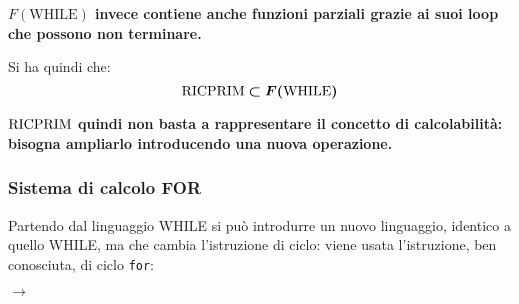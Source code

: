 \textbf{$F(\text{WHILE})$ invece contiene anche funzioni parziali grazie ai suoi loop che possono
non terminare.}

Si ha quindi che:
$$ \bm{\text{RICPRIM} \subset F(\text{WHILE})} $$

\textbf{$\text{RICPRIM}$ quindi non basta a rappresentare il concetto di calcolabilità: bisogna 
ampliarlo introducendo una nuova operazione.}

\subsubsection*{Sistema di calcolo FOR}
Partendo dal linguaggio WHILE si può introdurre un nuovo linguaggio, identico a quello WHILE,
ma che cambia l'istruzione di ciclo: viene usata l'istruzione, ben conosciuta, di
ciclo \texttt{for}:

\begin{center}
\begin{minipage}{.43\textwidth}
\begin{tcolorbox}[colback=white,sharp corners,boxrule=.2mm]
\end{tcolorbox}
\end{minipage}
\begin{minipage}{.1\textwidth}
    \hspace{1.5em}$\to$
\end{minipage}
\begin{minipage}{.43\textwidth}
\begin{tcolorbox}[colback=white,sharp corners,boxrule=.2mm]
\end{tcolorbox}
\end{minipage}
\end{center}

